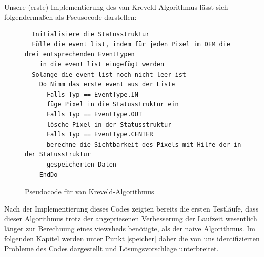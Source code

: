 Unsere (erste) Implementierung des van Kreveld-Algorithmus lässt sich folgendermaßen als Pseusocode darstellen:

\begin{figure}[!ht]
 \centering
 \begin{BVerbatim}
  Initialisiere die Statusstruktur 
  Fülle die event list, indem für jeden Pixel im DEM die drei entsprechenden Eventtypen 
    in die event list eingefügt werden  
  Solange die event list noch nicht leer ist 
    Do Nimm das erste event aus der Liste 
      Falls Typ == EventType.IN
	  füge Pixel in die Statusstruktur ein
      Falls Typ == EventType.OUT
	  lösche Pixel in der Statusstruktur 
      Falls Typ == EventType.CENTER
	  berechne die Sichtbarkeit des Pixels mit Hilfe der in der Statusstruktur 
	  gespeicherten Daten
    EndDo

 \end{BVerbatim}
 \caption{Pseudocode für van Kreveld-Algorithmus}
 \label{pseudo_krev}
\end{figure}

Nach der Implementierung dieses Codes zeigten bereits die ersten Testläufe, dass dieser Algorithmus trotz der angepriesenen Verbesserung der Laufzeit 
wesentlich länger zur Berechnung eines viewsheds benötigte, als der naive Algorithmus. Im folgenden Kapitel werden unter Punkt \ref{speicher} daher 
die von uns identifizierten Probleme des Codes dargestellt und Lösungsvorschläge unterbreitet. 

